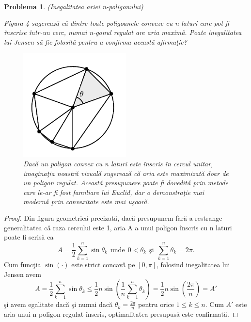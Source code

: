 \documentclass[a4paper,12pt,oneside]{report}
\newtheorem{problem}{Problema}
\begin{document}
\begin{problem} (Inegalitatea ariei n-poligonului)

Figura 4 sugereaz\u{a} c\u{a}  dintre toate poligoanele convexe cu n laturi care pot fi \^{i}nscrise \^{i}ntr-un cerc, numai n-gonul regulat are aria maxim\u{a}. Poate inegalitatea lui Jensen s\u{a} fie folosit\u{a} pentru a confirma aceast\u{a} afirma\c{t}ie?

\begin{figure}[htbp]
	\centering
	\includegraphics[width=0.5\textwidth]{fig_pb6.png}
	\caption{ Dac\u{a} un poligon convex cu n laturi este \^{i}nscris \^{i}n cercul unitar, imagina\c{t}ia noastr\u{a} vizual\u{a} sugereaz\u{a} c\u{a} aria este maximizat\u{a} doar de un poligon regulat. Aceast\u{a} presupunere poate fi dovedit\u{a} prin metode care le-ar fi fost familiare lui Euclid, dar o demonstra\c{t}ie mai modern\u{a} prin convexitate este mai u\c{s}oar\u{a}.}
\end{figure}


\end{problem}
\begin{proof}
Din figura geometric\u{a} precizat\u{a}, dac\u{a} presupunem f\u{a}r\u{a} a restrange generalitatea c\u{a} raza cercului este 1, aria A a unui poligon \^{i}nscris cu n laturi poate fi scris\u{a} ca
\begin{displaymath}
  A = \frac{1}{2}\sum_{k = 1}^{n} \sin \theta _{k} ~~\text{unde} ~~0< \theta _{k} ~~\text{\c{s}i}~~ \sum_{k = 1}^n{\theta _{k}} = 2\pi.
\end{displaymath}
  Cum func\c{t}ia  \(\sin \left ( \cdot  \right )\) este strict concav\u{a} pe \(\left [ 0 , \pi  \right ]\), folosind inegalitatea lui Jensen avem
\begin{displaymath}
  A = \frac{1}{2}\sum_{k = 1}^{n} \sin \theta _{k}  \leq \frac{1}{2}n\sin\left ( \frac{1}{n}\sum_{k = 1}^{n}\theta _{k} \right ) = \frac{1}{2}n\sin \left ( \frac{2\pi }{n} \right ) = {A}'
\end{displaymath}
\c{s}i avem egalitate dac\u{a} \c{s}i numai dac\u{a} \(\theta _{k} = \frac{2\pi }{n}\) pentru orice \(1\leq k\leq n\). Cum \({A}'\) este aria unui n-poligon regulat \^{i}nscris, optimalitatea presupus\u{a} este confirmat\u{a}.
\end{proof}
\end{document}
